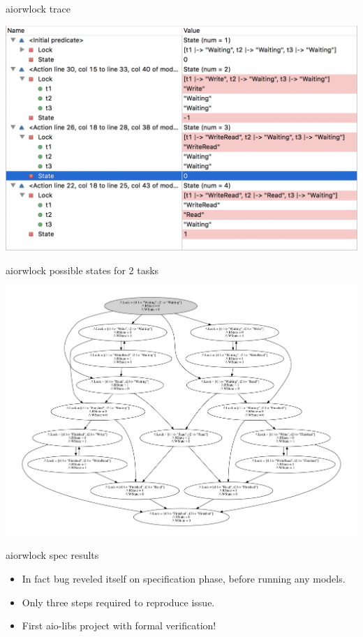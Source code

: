 \documentclass[12pt]{beamer}
\begin{document}
  \begin{frame}{aiorwlock trace}
      \begin{center}
          \includegraphics[scale=0.50]{figures/tla_trace}
      \end{center}
  \end{frame}
  \begin{frame}{aiorwlock possible states for 2 tasks}
      \begin{center}
          \includegraphics[scale=0.35,angle=90]{figures/aiorwlock_model}
      \end{center}
  \end{frame}
  \begin{frame}{aiorwlock spec results}
    \begin{itemize}
      \item In fact bug reveled itself on specification phase, before
          running any models.
      \item Only three steps required to reproduce issue.
      \item First aio-libs project with formal verification!
    \end{itemize}
  \end{frame}
\end{document}
